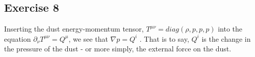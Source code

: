 \subsection{Exercise 8}
Inserting the dust energy-momentum tensor, $T^{\mu\nu}=diag(\rho,p,p,p)$ into the equation $\partial_\nu T^{\mu\nu}=Q^\mu$, we see that $\nabla p = Q^i$ . That is to say, $Q^i$ is the change in the pressure of the dust - or more simply, the external force on the dust.